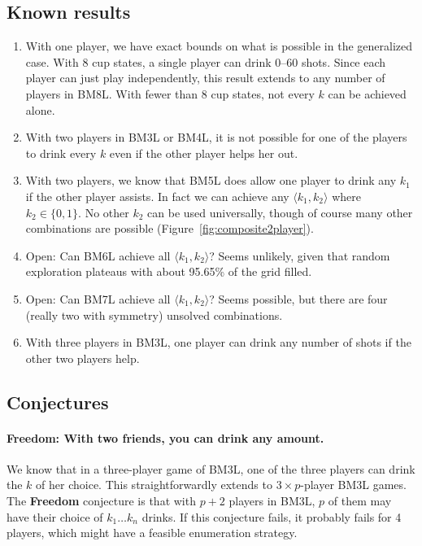 \documentclass[twocolumn]{article}
\begin{document}
\subsection{Known results}
\begin{enumerate}
  \item With one player, we have exact bounds on what is possible in
    the generalized case. With 8 cup states, a single player can
    drink 0--60 shots. Since each player can just play independently,
    this result extends to any number of players in BM8L. With fewer
    than 8 cup states, not every $k$ can be achieved alone.
  \item With two players in BM3L or BM4L, it is not possible for one
    of the players to drink every $k$ even if the other player helps her
    out.
  \item With two players, we know that BM5L does allow one player to
    drink any $k_1$ if the other player assists. In fact we can
    achieve any $\langle k_1, k_2 \rangle$ where $k_2 \in \{ 0, 1 \}$.
    No other $k_2$ can be used universally, though of course many
    other combinations are possible
    (Figure~\ref{fig:composite2player}).
  \item Open: Can BM6L achieve all $\langle k_1, k_2 \rangle$? Seems
    unlikely, given that random exploration plateaus with about 95.65\%
    of the grid filled.
  \item Open: Can BM7L achieve all $\langle k_1, k_2 \rangle$? Seems
    possible, but there are four (really two with symmetry) unsolved
    combinations.
  \item With three players in BM3L, one player can drink any number of
    shots if the other two players help.
\end{enumerate}

\subsection{Conjectures} \label{sec:conjectures}


\paragraph{Freedom: With two friends, you can drink any amount.} We know
that in a three-player game of BM3L, one of the three players can
drink the $k$ of her choice. This straightforwardly extends to $3
\times p$-player BM3L games. The {\bf Freedom} conjecture is that
with $p + 2$ players in BM3L, $p$ of them may have their choice of
$k_1 \ldots k_n$ drinks. If this conjecture fails, it probably fails
for 4 players, which might have a feasible enumeration strategy.
\end{document}
